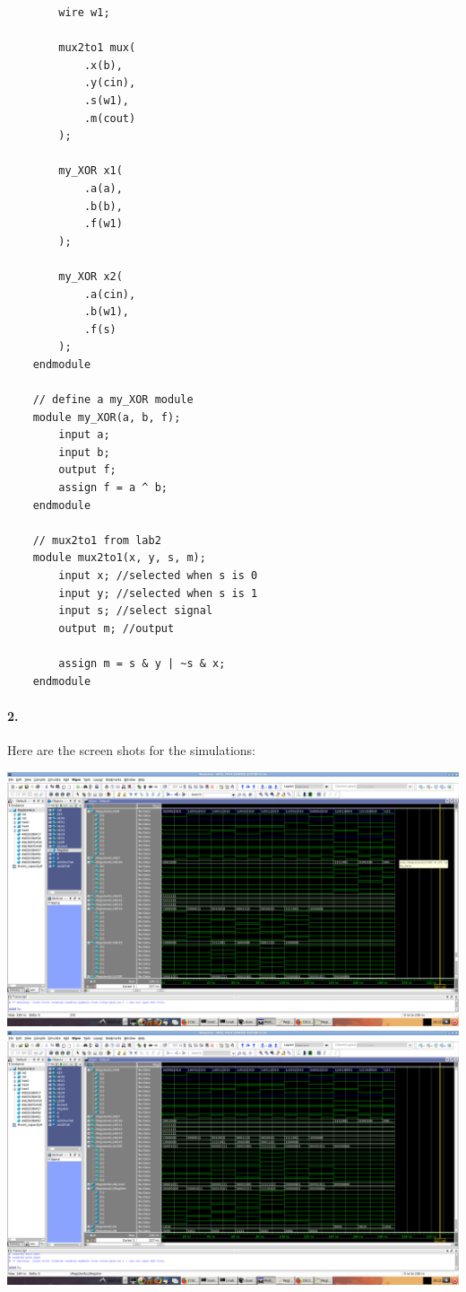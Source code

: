 \documentclass[oneside, 10pt]{article}
\begin{document}
\begin{verbatim}
        wire w1;
        
        mux2to1 mux(
            .x(b),
            .y(cin),
            .s(w1),
            .m(cout)
        );
        
        my_XOR x1(
            .a(a),
            .b(b),
            .f(w1)
        );
        
        my_XOR x2(
            .a(cin),
            .b(w1),
            .f(s)
        );
    endmodule

    // define a my_XOR module
    module my_XOR(a, b, f);
        input a;
        input b;
        output f;
        assign f = a ^ b;
    endmodule

    // mux2to1 from lab2
    module mux2to1(x, y, s, m);
        input x; //selected when s is 0
        input y; //selected when s is 1
        input s; //select signal
        output m; //output
        
        assign m = s & y | ~s & x;
    endmodule
\end{verbatim}
\paragraph{2.} Here are the screen shots for the simulations:
\begin{center}
    \includegraphics[scale=0.22]{pt2_hex_displays.png}
    \includegraphics[scale=0.22]{pt2_led_register.png}
\end{center}
\end{document}
